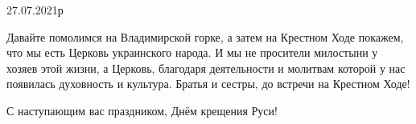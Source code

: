 \begin{itemize}
27.07.2021р

 

Давайте помолимся на Владимирской горке, а затем на Крестном Ходе покажем, что
мы есть Церковь украинского народа. И мы не просители милостыни у хозяев этой
жизни, а Церковь, благодаря деятельности и молитвам которой у нас появилась
духовность и культура. Братья и сестры, до встречи на Крестном Ходе!

С наступающим вас праздником, Днём крещения Руси!

\end{itemize}

